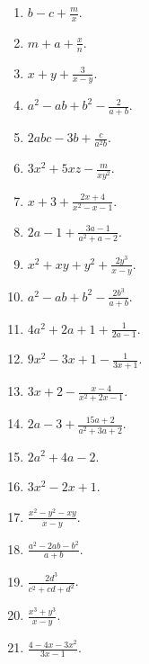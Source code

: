 \documentclass{book}
\begin{document}
\begin{enumerate}
\item $\displaystyle b-c+\frac{m}{x}$.

\item $\displaystyle m+a+\frac{x}{n}$.

\item $\displaystyle x+y+\frac{3}{x-y}$.

\item $\displaystyle a^2-ab+b^2-\frac{2}{a+b}$.

\item $\displaystyle 2abc-3b+\frac{c}{a^2b}$.

\item $\displaystyle 3x^2+5xz-\frac{m}{xy^2}$.

\item $\displaystyle x+3+\frac{2x+4}{x^2-x-1}$.

\item $\displaystyle 2a-1+\frac{3a-1}{a^2+a-2}$.

\item $\displaystyle x^2+xy+y^2+\frac{2y^3}{x-y}$.

\item $\displaystyle a^2-ab+b^2-\frac{2b^3}{a+b}$.

\item $\displaystyle 4a^2+2a+1+\frac{1}{2a-1}$.

\item $\displaystyle 9x^2-3x+1-\frac{1}{3x+1}$.

\item $\displaystyle 3x+2-\frac{x-4}{x^2+2x-1}$.

\item $\displaystyle 2a-3+\frac{15a+2}{a^2+3a+2}$.

\item $ 2a^2+4a-2$.

\item $3x^2-2x+1$.

\item $\displaystyle \frac{x^2-y^2-xy}{x-y}$.

\item $\displaystyle \frac{a^2-2ab-b^2}{a+b}$.

\item $\displaystyle \frac{2d^3}{c^2+cd+d^2}$.

\item $\displaystyle \frac{x^3+y^3}{x-y}$.

\item $\displaystyle \frac{4-4x-3x^2}{3x-1}$.


\end{enumerate}
\end{document}
